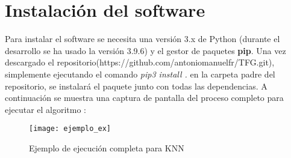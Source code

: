\section{Instalación del software}
Para instalar el software se necesita una versión 3.x de Python (durante el desarrollo se ha usado la versión 3.9.6) y el gestor de paquetes \textbf{pip}. Una vez descargado el repositorio(https://github.com/antoniomanuelfr/TFG.git), simplemente ejecutando el comando \textit{pip3 install .} en la carpeta padre del repositorio, se instalará el paquete junto con todas las dependencias.
A continuación se muestra una captura de pantalla del proceso completo para ejecutar el algoritmo :
\begin{figure}[H]
    \texttt{[image: ejemplo\_ex]}
    \caption{Ejemplo de ejecución completa para KNN}
    \label{cap:ex}
\end{figure}
